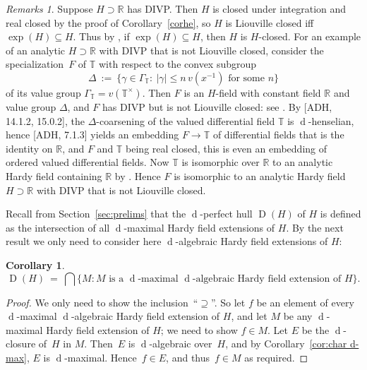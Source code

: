 \documentclass[]{amsart}
\numberwithin{equation}{section}
\newcommand{\bbold}{\mathbb}
\def\R { {\bbold R} }
\def\T { {\bbold T} }
\def \d{\operatorname{d}}
\newtheorem{cor}[theorem]{Corollary}
\theoremstyle{definition}
\theoremstyle{remark}
\newtheorem*{remarks}{Remarks}
\newcommand{\abs}[1]{\lvert#1\rvert}
\renewcommand\leq{\leqslant}
\renewcommand\le{\leq}
\begin{document}
\begin{remarks}
Suppose $H\supset\R$  has DIVP.  Then $H$ is  closed under integration and real closed by the proof of Corollary~\ref{corhe}, so $H$  is Liouville closed iff~${\exp(H)\subseteq H}$. Thus by  \cite[Corollary~2.6]{ADHip},
if $\exp(H)\subseteq H$, then $H$ is $H$-closed.
For an example of an analytic $H\supset\R$ with  DIVP that is not Liouville closed, consider the specialization~$F$
of $\T$ with respect to the convex subgroup $$\Delta\ :=\ \big\{ \gamma\in \Gamma_{\T}:\ \text{$\abs{\gamma}\le n\,v(x^{-1})$ for some $n$}\big\}$$
of its value group $\Gamma_{\T}=v(\T^\times)$. Then $F$ is an $H$-field with constant field $\R$ and value group $\Delta$, and $F$ has DIVP but is not
Liouville closed:
see \cite[Lemma~14.3 and subsequent remark]{hf2}. 
By [ADH, 14.1.2, 15.0.2], the $\Delta$-coarsening of the valued differential field $\T$ is $\d$-henselian,
hence [ADH, 7.1.3] yields an embedding $F\to\mathbb T$ of differential fields that is the identity on $\R$, and $F$ and $\T$ being real closed, this is even an embedding of
ordered valued differential fields. Now $\T$ is isomorphic over $\R$ to an analytic Hardy field containing $\R$ by \cite[Corollary~7.9]{AvdD}. Hence $F$ is isomorphic to an analytic Hardy field $H\supset \R$ with DIVP that is not Liouville closed. 
\end{remarks} 

\noindent
Recall from Section~\ref{sec:prelims} that the $\d$-perfect hull $\operatorname{D}(H)$ of $H$   is defined as the intersection of all $\d$-maximal Hardy field extensions of $H$.
By the next result we only need to consider  here  $\d$-algebraic Hardy field extensions of $H$:

\begin{cor}
$$\operatorname{D}(H)\ =\ \bigcap\big\{ M: \text{$M$ is a $\d$-maximal $\d$-algebraic Hardy field extension of $H$} \big\}.$$
\end{cor}
\begin{proof}
We only  need to show the inclusion~``$\supseteq$''. So let $f$ be an element of every $\d$-maximal $\d$-algebraic Hardy field extension of $H$, and let $M$ be any $\d$-maximal Hardy field extension of $H$; we need to show $f\in M$. Let $E$ be the $\d$-closure of~$H$ in $M$.
Then~$E$ is $\d$-algebraic over~$H$, and by Corollary~\ref{cor:char d-max}, $E$ is $\d$-maximal. Hence~$f\in E$, and thus~$f\in M$ as required.
\end{proof}
\end{document}
